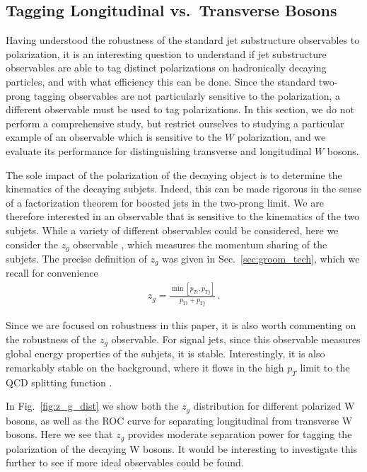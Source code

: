 \documentclass[11pt,letterpaper]{article}
\DeclareRobustCommand{\Sec}[1]{Sec.~\ref{#1}}
\DeclareRobustCommand{\Fig}[1]{Fig.~\ref{#1}}
\begin{document}
\subsection{Tagging Longitudinal vs.\ Transverse Bosons}\label{sec:polar_tag}

Having understood the robustness of the standard jet substructure observables to polarization, it is an interesting question to understand if jet substructure observables are able to tag distinct polarizations on hadronically decaying particles, and with what efficiency this can be done.
%
Since the standard two-prong tagging observables are not particularly sensitive to the polarization, a different observable must be used to tag polarizations.
%
In this section, we do not perform a comprehensive study, but restrict ourselves to studying a particular example of an observable which is sensitive to the $W$ polarization, and we evaluate its performance for distinguishing transverse and longitudinal $W$ bosons. 

The sole impact of the polarization of the decaying object is to determine the kinematics of the decaying subjets.
%
Indeed, this can be made rigorous in the sense of a factorization theorem for boosted jets in the two-prong limit.
%
We are therefore interested in an observable that is sensitive to the kinematics of the two subjets.
%
While a variety of different observables could be considered, here we consider the $z_g$ observable \cite{Larkoski:2014wba,Larkoski:2014bia,Larkoski:2015lea}, which measures the momentum sharing of the subjets. The precise definition of $z_g$ was given in \Sec{sec:groom_tech}, which we recall for convenience
\begin{align}
z_g=\frac{\min\left[ p_{Ti}, p_{Tj}  \right]}{p_{Ti}+p_{Tj}}\,.
\end{align}

Since we are focused on robustness in this paper, it is also worth commenting on the robustness of the $z_g$ observable. For signal jets, since this observable measures global energy properties of the subjets, it is stable.
%
Interestingly, it is also remarkably stable on the background, where it flows in the high $p_T$ limit to the QCD splitting function \cite{Larkoski:2014wba,Larkoski:2014bia,Larkoski:2015lea}.


In \Fig{fig:z_g_dist} we show both the $z_g$ distribution for different polarized W bosons, as well as the ROC curve for separating longitudinal from transverse W bosons. Here we see that $z_g$ provides moderate separation power for tagging the polarization of the decaying W bosons. It would be interesting to investigate this further to see if more ideal observables could be found.
\end{document}
